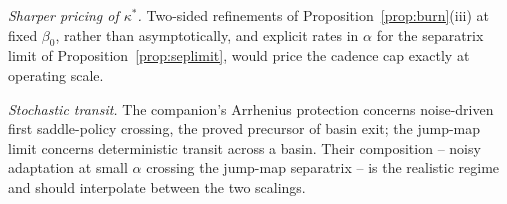 \documentclass[11pt]{article}
\theoremstyle{definition}
\theoremstyle{remark}
\numberwithin{equation}{section}
\begin{document}
\emph{Sharper pricing of $\kappa^\ast$.} Two-sided refinements of Proposition~\ref{prop:burn}(iii) at fixed $\beta_0$, rather than asymptotically, and explicit rates in $\alpha$ for the separatrix limit of Proposition~\ref{prop:seplimit}, would price the cadence cap exactly at operating scale.

\emph{Stochastic transit.} The companion's Arrhenius protection concerns noise-driven first saddle-policy crossing, the proved precursor of basin exit; the jump-map limit concerns deterministic transit across a basin. Their composition -- noisy adaptation at small $\alpha$ crossing the jump-map separatrix -- is the realistic regime and should interpolate between the two scalings.



\end{document}
